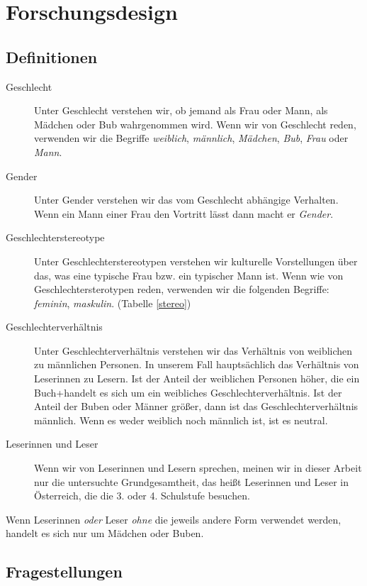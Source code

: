 \chapter{Forschungsdesign}

\section{Definitionen}

\begin{description}
\item[Geschlecht]
Unter Geschlecht verstehen wir, ob jemand als Frau oder Mann, als
Mädchen oder Bub wahrgenommen wird. Wenn wir von Geschlecht reden,
verwenden wir die Begriffe \emph{weiblich}, \emph{männlich},
\emph{Mädchen}, \emph{Bub}, \emph{Frau} oder \emph{Mann}.
\item[Gender]
Unter Gender verstehen wir das vom Geschlecht abhängige Verhalten. Wenn
ein Mann einer Frau den Vortritt lässt dann macht er \emph{Gender}.
\item[Geschlechterstereotype]
Unter Geschlechterstereotypen verstehen wir kulturelle Vorstellungen
über das, was eine typische Frau bzw. ein typischer Mann ist. Wenn wie
von Geschlechtersterotypen reden, verwenden wir die folgenden Begriffe:
\emph{feminin}, \emph{maskulin}. (Tabelle \ref{stereo})
\item[Geschlechterverhältnis]
Unter Geschlechterverhältnis verstehen wir das Verhältnis von weiblichen
zu männlichen Personen. In unserem Fall hauptsächlich das Verhältnis von
Leserinnen zu Lesern. Ist der Anteil der weiblichen Personen höher, die
ein Buch+handelt es sich um ein weibliches Geschlechterverhältnis. Ist
der Anteil der Buben oder Männer größer, dann ist das
Geschlechterverhältnis männlich. Wenn es weder weiblich noch männlich
ist, ist es neutral.
\item[Leserinnen und Leser]
Wenn wir von Leserinnen und Lesern sprechen, meinen wir in dieser Arbeit
nur die untersuchte Grundgesamtheit, das heißt Leserinnen und Leser in
Österreich, die die 3. oder 4. Schulstufe besuchen.
\end{description}

Wenn Leserinnen \emph{oder} Leser \emph{ohne} die jeweils andere Form
verwendet werden, handelt es sich nur um Mädchen oder Buben.

\section{Fragestellungen}

